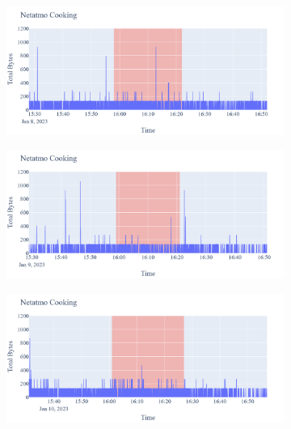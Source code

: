 \begin{figure}[H]
    \begin{subfigure}[b]{0.47\textwidth}
        \centering
        \includegraphics[width=1.2\hsize]{figures/Netatmo_Cooking_Bytes_08.01.png}
    \end{subfigure}
    \begin{subfigure}[b]{0.47\textwidth}
        \centering
        \includegraphics[width=1.2\hsize]{figures/Netatmo_Cooking_Bytes_09.01.png}
    \end{subfigure}
    \begin{subfigure}[b]{0.47\textwidth}
        \centering
        \includegraphics[width=1.2\hsize]{figures/Netatmo_Cooking_Bytes_10.01.png}
    \end{subfigure}
    \begin{subfigure}[b]{0.47\textwidth}

\end{subfigure}
\end{figure}
